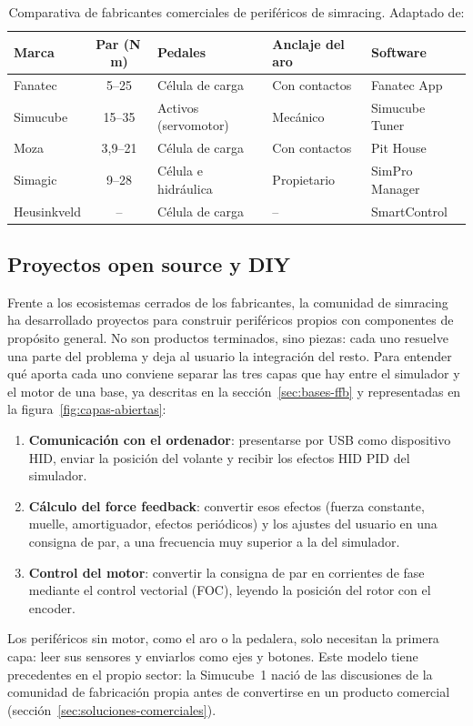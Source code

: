 \begin{table}[htbp]
	\centering
	\caption[Comparativa de fabricantes comerciales de periféricos de simracing]{Comparativa de fabricantes comerciales de periféricos de simracing. Adaptado de: \parencite{fanatec_web, simucube_web, moza_web, simagic_web, heusinkveld_web}}
	\label{tab:comerciales}
	\small
	\begin{tabular}{|l|c|l|l|l|}
		\hline
		\textbf{Marca} & \textbf{Par (N\,m)} & \textbf{Pedales} & \textbf{Anclaje del aro} & \textbf{Software} \\
		\hline
		Fanatec     & 5--25   & Célula de carga      & Con contactos & Fanatec App \\
		Simucube    & 15--35  & Activos (servomotor) & Mecánico      & Simucube Tuner \\
		Moza        & 3,9--21 & Célula de carga      & Con contactos & Pit House \\
		Simagic     & 9--28   & Célula e hidráulica  & Propietario   & SimPro Manager \\
		Heusinkveld & --      & Célula de carga      & --            & SmartControl \\
		\hline
	\end{tabular}
\end{table}


\subsection{Proyectos open source y DIY}
\label{sec:soluciones-abiertas}

Frente a los ecosistemas cerrados de los fabricantes, la comunidad de simracing ha desarrollado proyectos para construir periféricos propios con componentes de propósito general. No son productos terminados, sino piezas: cada uno resuelve una parte del problema y deja al usuario la integración del resto. Para entender qué aporta cada uno conviene separar las tres capas que hay entre el simulador y el motor de una base, ya descritas en la sección~\ref{sec:bases-ffb} y representadas en la figura~\ref{fig:capas-abiertas}:
\begin{enumerate}
	\item \textbf{Comunicación con el ordenador}: presentarse por USB como dispositivo HID, enviar la posición del volante y recibir los efectos HID PID del simulador.
	\item \textbf{Cálculo del force feedback}: convertir esos efectos (fuerza constante, muelle, amortiguador, efectos periódicos) y los ajustes del usuario en una consigna de par, a una frecuencia muy superior a la del simulador.
	\item \textbf{Control del motor}: convertir la consigna de par en corrientes de fase mediante el control vectorial (FOC), leyendo la posición del rotor con el encoder.
\end{enumerate}
Los periféricos sin motor, como el aro o la pedalera, solo necesitan la primera capa: leer sus sensores y enviarlos como ejes y botones. Este modelo tiene precedentes en el propio sector: la Simucube~1 nació de las discusiones de la comunidad de fabricación propia antes de convertirse en un producto comercial (sección~\ref{sec:soluciones-comerciales}).

